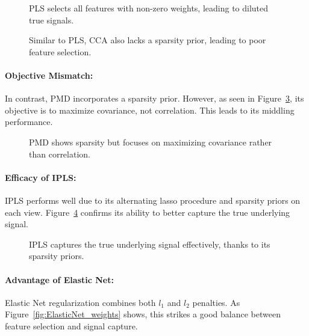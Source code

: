 \begin{figure}[h]
    \centering
    
    \caption{PLS selects all features with non-zero weights, leading to diluted true signals.}
    \label{fig:PLS_weights}
\end{figure}

\begin{figure}[h]
    \centering
    
    \caption{ Similar to PLS, CCA also lacks a sparsity prior, leading to poor feature selection.}
    \label{fig:CCA_weights}
\end{figure}

\paragraph{Objective Mismatch:}
In contrast, PMD incorporates a sparsity prior. However, as seen in Figure~\ref{fig:PMD_weights}, its objective is to maximize covariance, not correlation. This leads to its middling performance.

\begin{figure}[h]
    \centering
    
    \caption{PMD shows sparsity but focuses on maximizing covariance rather than correlation.}
    \label{fig:PMD_weights}
\end{figure}

\paragraph{Efficacy of IPLS:}
IPLS performs well due to its alternating lasso procedure and sparsity priors on each view. Figure~\ref{fig:IPLS_weights} confirms its ability to better capture the true underlying signal.

\begin{figure}[h]
    \centering
    
    \caption{IPLS captures the true underlying signal effectively, thanks to its sparsity priors.}
    \label{fig:IPLS_weights}
\end{figure}

\paragraph{Advantage of Elastic Net:}
Elastic Net regularization combines both $l_1$ and $l_2$ penalties. As Figure~\ref{fig:ElasticNet_weights} shows, this strikes a good balance between feature selection and signal capture.

